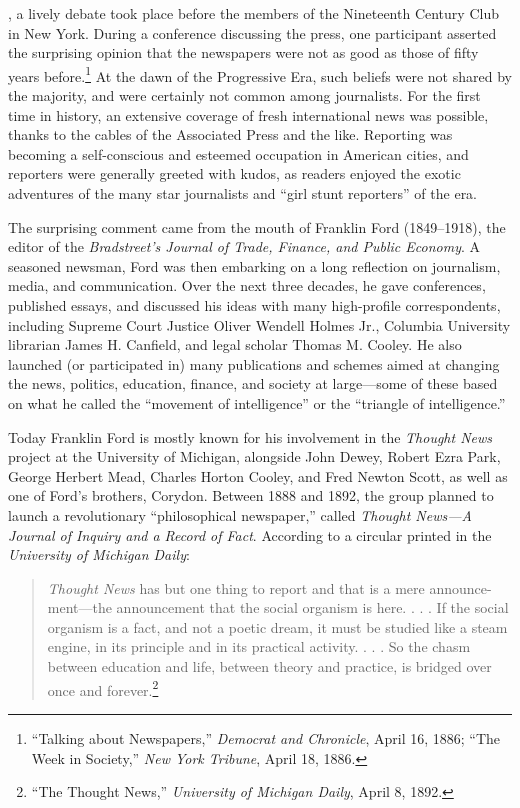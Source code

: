 \documentclass[twoside,symmetric,nobib,justified]{tufte-book}
\begin{document}
,  a lively debate took place before the members of the
Nineteenth Century Club in New York. During a conference discussing the
press, one participant asserted the surprising opinion that the
newspapers were not as good as those of fifty years before.\footnote{``Talking
  about Newspapers,'' \emph{Democrat and Chronicle}, April 16, 1886;
  ``The Week in Society,'' \emph{New York Tribune}, April 18, 1886.} At
the dawn of the Progressive Era, such beliefs were not shared by the
majority, and were certainly not common among journalists. For the first
time in history, an extensive coverage of fresh international news was
possible, thanks to the cables of the Associated Press and the like.
Reporting was becoming a self-conscious and esteemed occupation in
American cities, and reporters were generally greeted with kudos, as
readers enjoyed the exotic adventures of the many star journalists and
``girl stunt reporters'' of the era.

The surprising comment came from the mouth of Franklin Ford
(1849--1918), the editor of the \emph{Bradstreet's Journal of Trade,
Finance, and Public Economy}. A seasoned newsman, Ford was then
embarking on a long reflection on journalism, media, and communication.
Over the next three decades, he gave conferences, published essays, and
discussed his ideas with many high-profile correspondents, including
Supreme Court Justice Oliver Wendell Holmes Jr., Columbia University
librarian James H. Canfield, and legal scholar Thomas M. Cooley. He also
launched (or participated in) many publications and schemes aimed at
changing the news, politics, education, finance, and society at
large---some of these based on what he called the ``movement of
intelligence'' or the ``triangle of intelligence.''

Today Franklin Ford is mostly known for his involvement in the
\emph{Thought News} project at the University of Michigan, alongside
John Dewey, Robert Ezra Park, George Herbert Mead, Charles Horton
Cooley, and Fred Newton Scott, as well as one of Ford's brothers,
Corydon. Between 1888 and 1892, the group planned to launch a
revolutionary ``philosophical newspaper,'' called \emph{Thought News---A
Journal of Inquiry and a Record of Fact}. According to a circular
printed in the \emph{University of Michigan Daily}:

\begin{quote}
\emph{Thought News} has but one thing to report and that is a mere
announce-\\\noindent ment---the announcement that the social organism is here. . . .
If the social organism is a fact, and not a poetic dream, it must be
studied like a steam engine, in its principle and in its practical
activity. . . . So the chasm between education and life, between theory
and practice, is bridged over once and forever.\footnote{``The Thought
  News,'' \emph{University of Michigan Daily}, April 8, 1892.}
\end{quote}
\end{document}
